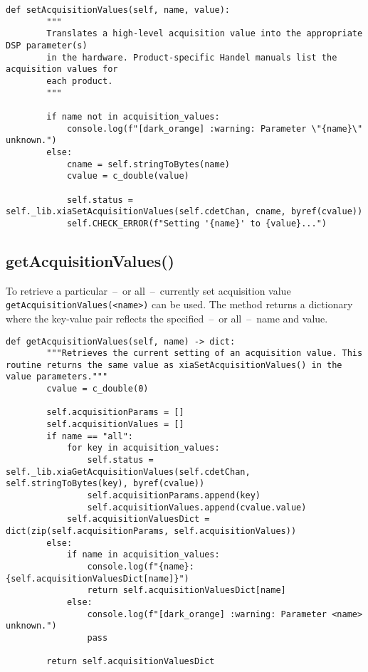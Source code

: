             \begin{lstlisting}[style=mypython, firstnumber=117, caption={[XMagix method setAcquisitionValues()]XMagix method setAcquisitionValues().}, label={lst:xmagix setAcquisitionValues}]
    def setAcquisitionValues(self, name, value):
        """
        Translates a high-level acquisition value into the appropriate DSP parameter(s)
        in the hardware. Product-specific Handel manuals list the acquisition values for
        each product.
        """

        if name not in acquisition_values:
            console.log(f"[dark_orange] :warning: Parameter \"{name}\" unknown.")
        else:
            cname = self.stringToBytes(name)
            cvalue = c_double(value)

            self.status = self._lib.xiaSetAcquisitionValues(self.cdetChan, cname, byref(cvalue))
            self.CHECK_ERROR(f"Setting '{name}' to {value}...")
            \end{lstlisting}
        
        \subsection{getAcquisitionValues()}\label{sec:getAcquisitionValues}
            To retrieve a particular~--~or all~--~currently set acquisition value \texttt{getAcquisitionValues(<name>)} can be used.
            The method returns a dictionary where the key-value pair reflects the specified~--~or all~--~name and value.\par\medskip

            \begin{lstlisting}[style=mypython, firstnumber=133, caption={[XMagix method getAcquisitionValues()]XMagix method getAcquisitionValues().}, label={lst:xmagix getAcquisitionValues}]
    def getAcquisitionValues(self, name) -> dict:
        """Retrieves the current setting of an acquisition value. This routine returns the same value as xiaSetAcquisitionValues() in the value parameters."""
        cvalue = c_double(0)

        self.acquisitionParams = []
        self.acquisitionValues = []
        if name == "all":
            for key in acquisition_values:
                self.status = self._lib.xiaGetAcquisitionValues(self.cdetChan, self.stringToBytes(key), byref(cvalue))
                self.acquisitionParams.append(key)
                self.acquisitionValues.append(cvalue.value)
            self.acquisitionValuesDict = dict(zip(self.acquisitionParams, self.acquisitionValues))
        else:
            if name in acquisition_values:
                console.log(f"{name}: {self.acquisitionValuesDict[name]}")
                return self.acquisitionValuesDict[name]
            else:
                console.log(f"[dark_orange] :warning: Parameter <name> unknown.")
                pass
                
        return self.acquisitionValuesDict
            \end{lstlisting}
        
